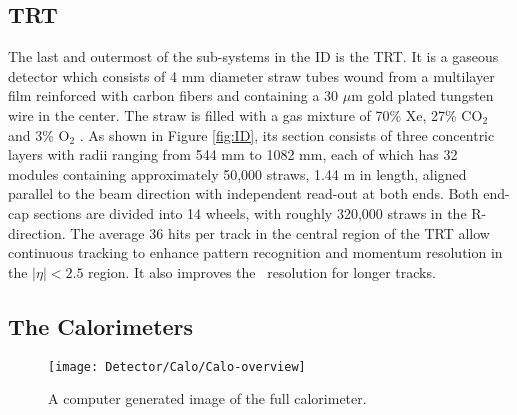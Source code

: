 			\subsection*{TRT}
			 
				The last and outermost of the sub-systems in the ID is the TRT. It is a gaseous detector which consists of 4 mm diameter straw tubes wound from a multilayer film reinforced with carbon fibers and containing a 30 $\mu$m gold plated tungsten wire in the center. The straw is filled with a gas mixture of 70\% Xe, 27\% CO$_2$ and 3\% O$_2$ \cite{TRT2012}. As shown in Figure \ref{fig:ID}, its section consists of three concentric layers with radii ranging from 544 mm to 1082 mm, each of which has 32 modules containing approximately 50,000 straws, 1.44 m in length, aligned parallel to the beam direction with independent read-out at both ends. Both end-cap sections are divided into 14 wheels, with roughly 320,000 straws in the R-direction. The average 36 hits per track in the central region of the TRT allow continuous tracking to enhance pattern recognition and momentum resolution in the $\left| \eta \right| < 2.5$ region. It also improves the \pt\ resolution for longer tracks.



		\subsection{The Calorimeters}

			\begin{figure}[!htb]
				\centering
				\texttt{[image: Detector/Calo/Calo-overview]}
				\caption{A computer generated image of the full calorimeter.}
				\label{fig:Calo}
			\end{figure}

